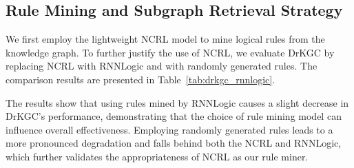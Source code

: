 \documentclass[11pt]{article}
\begin{document}
\subsection{Rule Mining and Subgraph Retrieval Strategy}\label{app:subgraph retrieval strategy}
We first employ the lightweight NCRL model to mine logical rules from the knowledge graph. To further justify the use of NCRL, we evaluate DrKGC by replacing NCRL with RNNLogic and with randomly generated rules. The comparison results are presented in Table~\ref{tab:drkgc_rnnlogic}.

\begin{table}[h]
    \centering
    \caption{Performance of DrKGC with RNNLogic and random rules ($\Delta \%$ values indicate differences from using NCRL).}
    \label{tab:drkgc_rnnlogic}
\end{table}

The results show that using rules mined by RNNLogic causes a slight decrease in DrKGC’s performance, demonstrating that the choice of rule mining model can influence overall effectiveness. Employing randomly generated rules leads to a more pronounced degradation and falls behind both the NCRL and RNNLogic, which further validates the appropriateness of NCRL as our rule miner.
\end{document}
